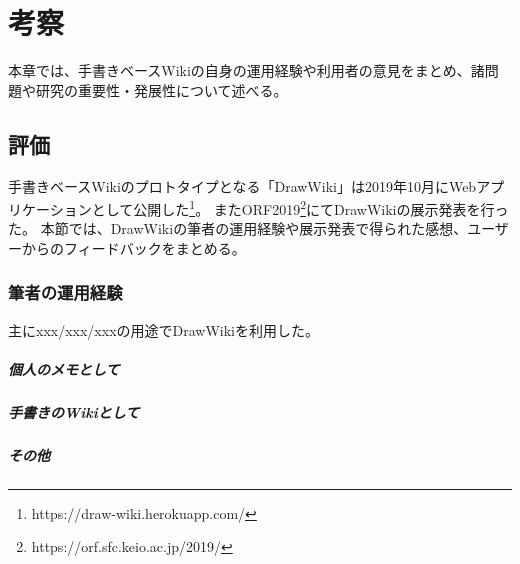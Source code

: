 \chapter{考察}
\label{chap:kosatsu}

本章では、手書きベースWikiの自身の運用経験や利用者の意見をまとめ、諸問題や研究の重要性・発展性について述べる。

\newpage

\section{評価}
手書きベースWikiのプロトタイプとなる「DrawWiki」は2019年10月にWebアプリケーションとして公開した\footnote{ \textsf{https://draw-wiki.herokuapp.com/} }。
またORF2019\footnote{ \textsf{https://orf.sfc.keio.ac.jp/2019/} }にてDrawWikiの展示発表を行った。
本節では、DrawWikiの筆者の運用経験や展示発表で得られた感想、ユーザーからのフィードバックをまとめる。

\subsection{筆者の運用経験}
主にxxx/xxx/xxxの用途でDrawWikiを利用した。

\paragraph*{個人のメモとして}
\paragraph*{手書きのWikiとして}
\paragraph*{その他}

